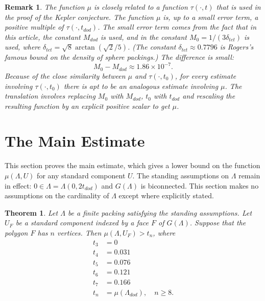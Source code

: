\documentclass{article} %
\newtheorem{theorem}{Theorem}[section]
\newtheorem{remark}[lemma]{Remark}
\begin{document}
\begin{remark}\label{rem:sq} The function $\mu$ is closely related to a function
$\tau(\cdot,t)$ that is used in the proof of the Kepler conjecture.  The
function $\mu$ is, up to a small error term, a positive multiple
of $\tau(\cdot,t_{dod})$.   The small
error term comes from the fact that in this article, the constant
$M_{dod}$ is used, and in \cite{Hales:2006:DCG} the constant
$M_0=1/(3 \delta_{tet})$ is used, where $\delta_{tet} = \sqrt8 \arctan(\sqrt2/5)$.  (The constant $\delta_{tet}\approx 0.7796$ is Rogers's famous bound on the density of sphere packings.)  The difference is small:
   $$M_0 - M_{dod} \approx 1.86 \times 10^{-7}.$$
Because of the close similarity between $\mu$ and $\tau(\cdot,t_0)$,
for every estimate involving $\tau(\cdot,t_0)$ there is apt to
be an analogous estimate involving $\mu$.  The translation involves
replacing $M_0$ with $M_{dod}$, $t_0$ with $t_{dod}$ and rescaling the
resulting function by an explicit positive scalar to get $\mu$.
\end{remark}



\section{The Main Estimate}

This section proves the main estimate, which gives a lower
bound on the function $\mu(\Lambda,U)$ for any standard component $U$.
The standing
assumptions on $\Lambda$ remain in effect: $0\in\Lambda= \Lambda(0,2t_{dod})$ and $G(\Lambda)$ is  biconnected.  This section makes
no assumptions on the cardinality 
of $\Lambda$ except where explicitly stated.

\begin{theorem}\label{thm:main}  
Let $\Lambda$ be a finite packing satisfying the
standing assumptions.  Let $U_F$ be a standard component indexed by
a face $F$ of $G(\Lambda)$.  Suppose that the polygon 
$F$ has $n$ vertices.  Then
   $\mu(\Lambda,U_F) > t_n$, where 
$$
\begin{array}{lll}
 t_3 &= 0\\
 t_4 &= 0.031\\
 t_5 &= 0.076\\
 t_6 &= 0.121\\
 t_7 &= 0.166\\
 t_n &= \mu(\Lambda_{dod}),\quad n\ge 8.
\end{array}
$$
\end{theorem}
\end{document}
